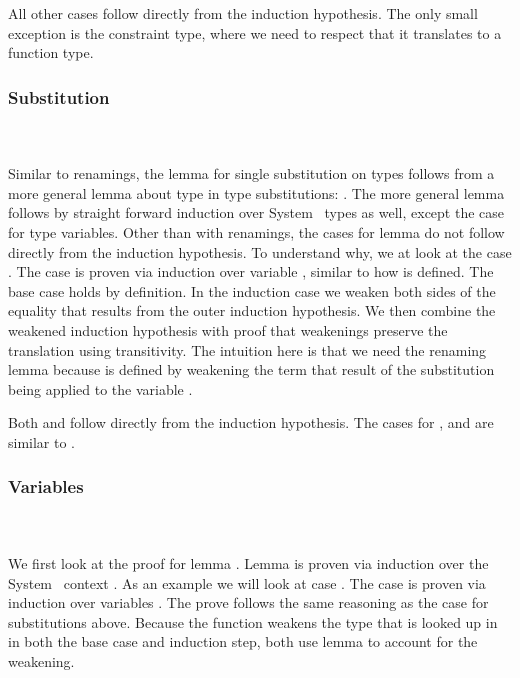 \noindent All other cases follow directly from the induction hypothesis. 
The only small exception is the constraint type, where we need to respect that it translates to a function type.

\subsubsection{Substitution}\hfill\\\\
Similar to renamings, the lemma for single substitution on types  follows from a more general lemma about type in type substitutions: \DPTTypePresSingleSub. 
The more general lemma  follows by straight forward induction over System \Fo\ types as well, except the case for type variables. 
Other than with renamings, the cases for lemma  do not follow directly from the induction hypothesis. 
To understand why, we at look at the case .
\DPTVarPresSub
The case  is proven via induction over variable , similar to how  is defined. 
The base case holds by definition. 
In the induction case we weaken both sides of the equality that results from the outer induction hypothesis. We then combine the weakened induction hypothesis with proof that weakenings preserve the translation using transitivity. 
The intuition here is that we need the renaming lemma  because  is defined by weakening the term that result of the substitution  being applied to the variable .

\noindent Both  and  follow directly from the induction hypothesis. 
The cases for ,  and  are similar to .

\subsubsection{Variables}\hfill\\\\
We first look at the proof for lemma . 
Lemma  is proven via induction over the System \Fo\ context . 
\DPTVarPresLookup
As an example we will look at case   . The case is proven via induction over variables . 
The prove follows the same reasoning as the  case for substitutions above. 
Because the function  weakens the type  that is looked up in  in both the base case and induction step, both use lemma  to account for the weakening. 

